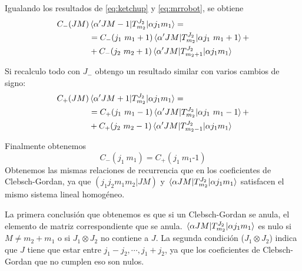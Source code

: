 Igualando los resultados de \eqref{eq:ketchup} y \eqref{eq:mrrobot},
se obtiene
\begin{equation}
  \begin{split}
    C_-(JM)& \mel{\alpha' J M-1}{T_{m_2}^{J_2}}{\alpha j_1 m_1} = \\
    &= C_- ( j_1 \ m_1 +
    1) \mel{\alpha' J M}{T_{m_2}^{J_2}}{\alpha j_1 \ m_1 + 1}+ \\
    &+ C_-(j_2 \ m_2+1)\mel{\alpha' J M}{T_{m_2+1}^{J_2}}{\alpha j_1 m_1}
  \end{split}
\end{equation}

Si recalculo todo con $J_-$ obtengo un resultado similar con varios cambios
de signo:
\begin{equation}
  \begin{split}
    C_+(JM) & \mel{\alpha' J M+1}{T_{m_2}^{J_2}}{\alpha j_1 m_1} = \\
    &= C_+ ( j_1 \ m_1 -
    1) \mel{\alpha' J M}{T_{m_2}^{J_2}}{\alpha j_1\  m_1 - 1}+ \\
    &+ C_+(j_2\  m_2-1)\mel{\alpha' J M}{T_{m_2-1}^{J_2}}{\alpha j_1 m_1}
  \end{split}
\end{equation}

Finalmente obtenemos
\begin{equation}
  \boxed{ C_-(j_1\  m_1) = C_+ (j_1\  m_1{\text{-}}1)}
\end{equation}
Obtenemos las mismas relaciones de recurrencia que en los coeficientes de Clebsch-Gordan, ya que
$(j_1 j_2 m_1 m_2 | J M)$ y $\mel{\alpha J M}{ T_{m_2}^{J_2}}{\alpha j_1 m_1}$
satisfacen el mismo sistema lineal homogéneo. 

La primera conclusión que obtenemos es que si un Clebsch-Gordan se
anula, el elemento de matriz correspondiente
que se anula. $\mel{\alpha J M}{ T_{m_2}^{J_2}}{\alpha j_1 m_1}$ es nulo si
$M\neq m_2 + m_1$ o si $J_1 \otimes J_2$ no contiene a $J$. La segunda
condición ($J_1 \otimes J_2$) indica que $J$ tiene que estar entre
$j_1-j_2 , \cdots , j_1 + j_2$, ya que los coeficientes de
Clebsch-Gordan que no cumplen eso son nulos.

